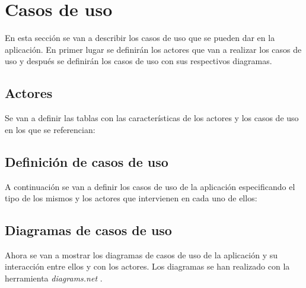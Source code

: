 

\section{Casos de uso}
En esta sección se van a describir los casos de uso que se pueden dar
en la aplicación. En primer lugar se definirán los actores que van a realizar
los casos de uso y después se definirán los casos de uso con sus respectivos
diagramas.

\subsection{Actores}
Se van a definir las tablas con las características de los actores y los casos
de uso en los que se referencian:



\subsection{Definición de casos de uso}
A continuación se van a definir los casos de uso de la aplicación especificando
el tipo de los mismos y los actores que intervienen en cada uno de ellos:



\newpage
\subsection{Diagramas de casos de uso}
Ahora se van a mostrar los diagramas de casos de uso de la aplicación y su interacción
entre ellos y con los actores. Los diagramas se han realizado con la herramienta
\textit{diagrams.net} \cite{diagramsnet}.

